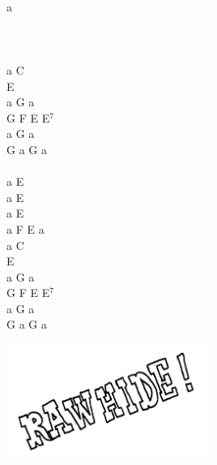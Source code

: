 \documentclass[a5paper, 10pt]{book}
\begin{document}
\begin{minipage}[t]{0.2\textwidth}
  ~\\
a\\
\\
\\
\\
a C\\
E\\
a G a\\
G F E E$^7$\\
a G a\\
G a G a\\
\\
a E \\
a E \\
a E\\
a F E a\\

a C\\
E\\
a G a\\
G F E E$^7$\\
a G a\\
G a G a\\
\end{minipage}
\includegraphics[width=0.5\textwidth,angle=-30, center]{images/rawhide.png}\\

\newpage
\end{document}

